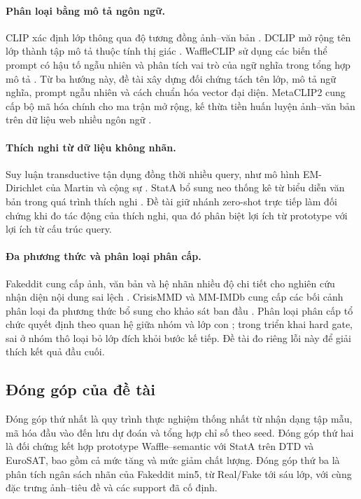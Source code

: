 \documentclass[12pt,a4paper]{article}
\numberwithin{figure}{section}
\numberwithin{table}{section}
\numberwithin{equation}{section}
\begin{document}
\paragraph{Phân loại bằng mô tả ngôn ngữ.}
CLIP xác định lớp thông qua độ tương đồng ảnh--văn bản \cite{clip}. DCLIP mở rộng tên lớp thành tập mô tả thuộc tính thị giác \cite{dclip}. WaffleCLIP sử dụng các biến thể prompt có hậu tố ngẫu nhiên và phân tích vai trò của ngữ nghĩa trong tổng hợp mô tả \cite{waffle}. Từ ba hướng này, đề tài xây dựng đối chứng tách tên lớp, mô tả ngữ nghĩa, prompt ngẫu nhiên và cách chuẩn hóa vector đại diện. MetaCLIP2 cung cấp bộ mã hóa chính cho ma trận mở rộng, kế thừa tiền huấn luyện ảnh--văn bản trên dữ liệu web nhiều ngôn ngữ \cite{metaclip}.

\paragraph{Thích nghi từ dữ liệu không nhãn.}
Suy luận transductive tận dụng đồng thời nhiều query, như mô hình EM-Dirichlet của Martin và cộng sự \cite{em}. StatA bổ sung neo thống kê từ biểu diễn văn bản trong quá trình thích nghi \cite{stata}. Đề tài giữ nhánh zero-shot trực tiếp làm đối chứng khi đo tác động của thích nghi, qua đó phân biệt lợi ích từ prototype với lợi ích từ cấu trúc query.

\paragraph{Đa phương thức và phân loại phân cấp.}
Fakeddit cung cấp ảnh, văn bản và hệ nhãn nhiều độ chi tiết cho nghiên cứu nhận diện nội dung sai lệch \cite{fakeddit}. CrisisMMD và MM-IMDb cung cấp các bối cảnh phân loại đa phương thức bổ sung cho khảo sát ban đầu \cite{crisis,mmimdb}. Phân loại phân cấp tổ chức quyết định theo quan hệ giữa nhóm và lớp con \cite{hierarchy}; trong triển khai hard gate, sai ở nhóm thô loại bỏ lớp đích khỏi bước kế tiếp. Đề tài đo riêng lỗi này để giải thích kết quả đầu cuối.

\subsection{Đóng góp của đề tài}
Đóng góp thứ nhất là quy trình thực nghiệm thống nhất từ nhận dạng tập mẫu, mã hóa đầu vào đến lưu dự đoán và tổng hợp chỉ số theo seed. Đóng góp thứ hai là đối chứng kết hợp prototype Waffle--semantic với StatA trên DTD và EuroSAT, bao gồm cả mức tăng và mức giảm chất lượng. Đóng góp thứ ba là phân tích ngân sách nhãn của Fakeddit min5, từ Real/Fake tới sáu lớp, với cùng đặc trưng ảnh--tiêu đề và các support đã cố định.
\end{document}
